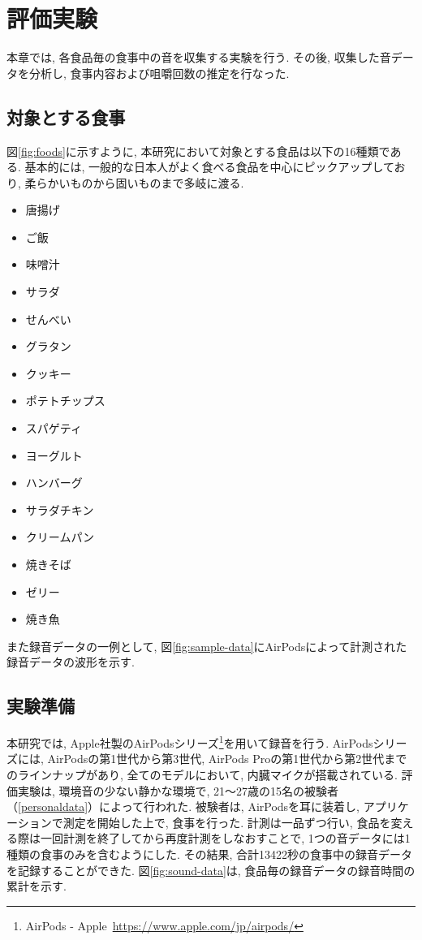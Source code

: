 
\chapter{評価実験}

本章では, 各食品毎の食事中の音を収集する実験を行う. その後, 収集した音データを分析し, 食事内容および咀嚼回数の推定を行なった.

\section{対象とする食事}

図\ref{fig:foods}に示すように, 本研究において対象とする食品は以下の16種類である. 基本的には, 一般的な日本人がよく食べる食品を中心にピックアップしており, 柔らかいものから固いものまで多岐に渡る.

\begin{itemize}
    \item 唐揚げ
    \item ご飯
    \item 味噌汁
    \item サラダ
    \item せんべい
    \item グラタン
    \item クッキー
    \item ポテトチップス
    \item スパゲティ
    \item ヨーグルト
    \item ハンバーグ
    \item サラダチキン
    \item クリームパン
    \item 焼きそば
    \item ゼリー
    \item 焼き魚
\end{itemize}

また録音データの一例として, 図\ref{fig:sample-data}にAirPodsによって計測された録音データの波形を示す.

\section{実験準備}

本研究では, Apple社製のAirPodsシリーズ\footnote{AirPods - Apple~\url{https://www.apple.com/jp/airpods/}}を用いて録音を行う. AirPodsシリーズには, AirPodsの第1世代から第3世代, AirPods Proの第1世代から第2世代までのラインナップがあり, 全てのモデルにおいて, 内臓マイクが搭載されている. 評価実験は, 環境音の少ない静かな環境で, 21〜27歳の15名の被験者（\tablename\ref{personaldata}）によって行われた. 被験者は, AirPodsを耳に装着し, アプリケーションで測定を開始した上で, 食事を行った. 計測は一品ずつ行い, 食品を変える際は一回計測を終了してから再度計測をしなおすことで, 1つの音データには1種類の食事のみを含むようにした. その結果, 合計13422秒の食事中の録音データを記録することができた. 図\ref{fig:sound-data}は, 食品毎の録音データの録音時間の累計を示す.


